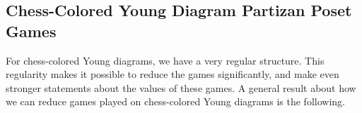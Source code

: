 %        

\subsection{Chess-Colored Young Diagram Partizan Poset Games}
For chess-colored Young diagrams, we have a very regular structure. This regularity makes it possible to reduce the games significantly, and make even stronger statements about the values of these games. A general result about how we can reduce games played on chess-colored Young diagrams is the following.

